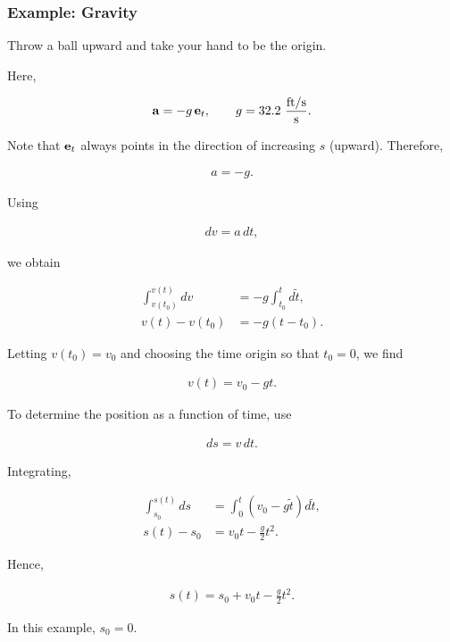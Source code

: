 \documentclass[
  letterpaper,
  DIV=11,
  numbers=noendperiod]{scrreprt}
\begin{document}
\subsubsection{Example: Gravity}\label{example-gravity}

Throw a ball upward and take your hand to be the origin.

Here,

\begin{align*}
{\bf a} = -g\,{\bf e}_t,
\qquad
g = 32.2\ \frac{\text{ft/s}}{\text{s}}.
\end{align*}

Note that \({\bf e}_t\) always points in the direction of increasing
\(s\) (upward). Therefore,

\begin{align*}
a=-g.
\end{align*}

Using

\begin{align*}
dv=a\,dt,
\end{align*}

we obtain

\begin{align*}
\int_{v(t_0)}^{v(t)} dv
&=
-g\int_{t_0}^{t} d\tilde{t},\\
v(t)-v(t_0)
&=
-g(t-t_0).
\end{align*}

Letting \(v(t_0)=v_0\) and choosing the time origin so that \(t_0=0\),
we find

\begin{align*}
v(t)=v_0-gt.
\end{align*}

To determine the position as a function of time, use

\begin{align*}
ds=v\,dt.
\end{align*}

Integrating,

\begin{align*}
\int_{s_0}^{s(t)} ds
&=
\int_{0}^{t}\left(v_0-g\tilde{t}\right)d\tilde{t},\\
s(t)-s_0
&=
v_0t-\frac{g}{2}t^2.
\end{align*}

Hence,

\begin{align*}
s(t)=s_0+v_0t-\frac{g}{2}t^2.
\end{align*}

In this example, \(s_0=0\).
\end{document}
